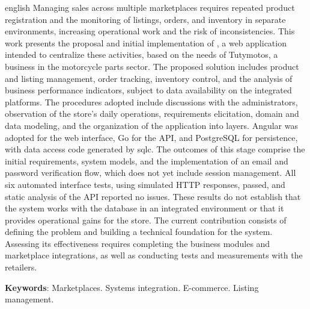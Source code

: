 \begin{resumo}[Abstract]
\begin{otherlanguage*}{english}
Managing sales across multiple marketplaces requires repeated product registration and the monitoring of listings, orders, and inventory in separate environments, increasing operational work and the risk of inconsistencies. This work presents the proposal and initial implementation of \sistema{}, a web application intended to centralize these activities, based on the needs of Tutymotos, a business in the motorcycle parts sector. The proposed solution includes product and listing management, order tracking, inventory control, and the analysis of business performance indicators, subject to data availability on the integrated platforms. The procedures adopted include discussions with the administrators, observation of the store's daily operations, requirements elicitation, domain and data modeling, and the organization of the application into layers. Angular was adopted for the web interface, Go for the API, and PostgreSQL for persistence, with data access code generated by sqlc. The outcomes of this stage comprise the initial requirements, system models, and the implementation of an email and password verification flow, which does not yet include session management. All six automated interface tests, using simulated HTTP responses, passed, and static analysis of the API reported no issues. These results do not establish that the system works with the database in an integrated environment or that it provides operational gains for the store. The current contribution consists of defining the problem and building a technical foundation for the system. Assessing its effectiveness requires completing the business modules and marketplace integrations, as well as conducting tests and measurements with the retailers.

\vspace{\onelineskip}
\noindent
\textbf{Keywords}: Marketplaces. Systems integration. E-commerce. Listing management.
\end{otherlanguage*}
\end{resumo}
